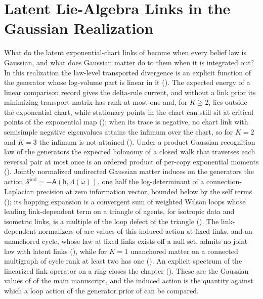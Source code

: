 \chapter[Latent Lie-Algebra Links]{Latent Lie-Algebra Links in the Gaussian Realization}
\label{ch:gauss-latent-links}

What do the latent exponential-chart links of  become when every belief law is
Gaussian, and what does Gaussian matter do to them when it is integrated out? In this realization
the law-level transported divergence is an explicit function of the generator whose log-volume
part is linear in it (). The expected energy of a linear
comparison record gives the delta-rule current, and without a link prior its minimizing transport
matrix has rank at most one and, for \(K\geq2\), lies outside the exponential chart, while stationary
points in the chart can still sit at critical points of the exponential map
(); when its trace is negative, no chart link with semisimple negative
eigenvalues attains the infimum over the chart, so for \(K=2\) and \(K=3\) the infimum is not attained
(). Under a product Gaussian recognition law of the
generators the expected holonomy of a closed walk that traverses each reversal pair at most once is
an ordered product of per-copy exponential moments
(). Jointly normalized undirected Gaussian matter induces on the
generators the action \(\mathscr S^{\mathrm{ind}}=-\mathsf A(\mathsf h,\Lambda(\mathring\omega))\),
one half the log-determinant of a connection-Laplacian precision at zero information vector,
bounded below by the self terms (); its hopping expansion is a
convergent sum of weighted Wilson loops whose leading link-dependent term on a triangle of agents,
for isotropic data and isometric links, is a multiple of the loop defect of the triangle
(). The link-dependent normalizers of
are values of this induced action at fixed links, and an unanchored cycle, whose law at fixed links
exists off a null set, admits no joint law with latent links (),
while for \(K=1\) unanchored matter on a connected multigraph of cycle rank at least two has one
(). An explicit spectrum of the linearized link operator on a
ring closes the chapter (). These are the Gaussian values of
of the main manuscript, and the induced action is the quantity against which a loop action of the
generator prior of  can be compared.

